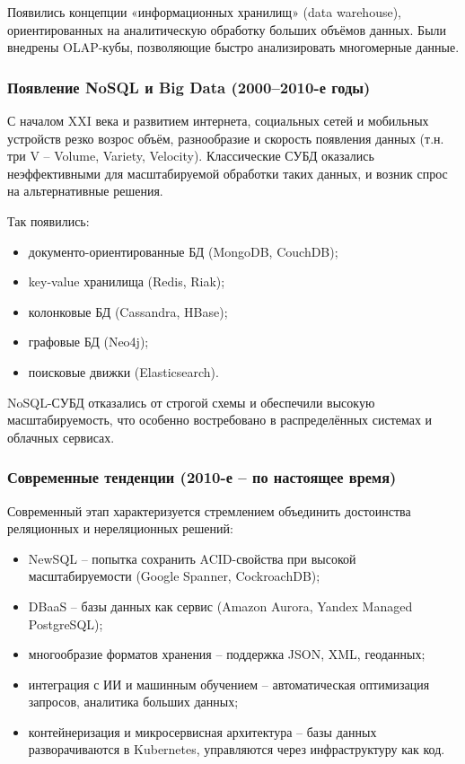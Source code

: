 Появились концепции «информационных хранилищ» (data warehouse), ориентированных на аналитическую обработку больших объёмов данных. Были внедрены OLAP-кубы, позволяющие быстро анализировать многомерные данные.

\subsubsection{Появление NoSQL и Big Data (2000--2010-е годы)}

С началом XXI века и развитием интернета, социальных сетей и мобильных устройств резко возрос объём, разнообразие и скорость появления данных (т.н. три V -- Volume, Variety, Velocity). Классические СУБД оказались неэффективными для масштабируемой обработки таких данных, и возник спрос на альтернативные решения.

Так появились:
\begin{itemize}
	\item документо-ориентированные БД (MongoDB, CouchDB);
	\item key-value хранилища (Redis, Riak);
	\item колонковые БД (Cassandra, HBase);
	\item графовые БД (Neo4j);
	\item поисковые движки (Elasticsearch).
\end{itemize}

NoSQL-СУБД отказались от строгой схемы и обеспечили высокую масштабируемость, что особенно востребовано в распределённых системах и облачных сервисах.

\subsubsection{Современные тенденции (2010-е -- по настоящее время)}

Современный этап характеризуется стремлением объединить достоинства реляционных и нереляционных решений:
\begin{itemize}
	\item NewSQL -- попытка сохранить ACID-свойства при высокой масштабируемости (Google Spanner, CockroachDB);
	\item DBaaS -- базы данных как сервис (Amazon Aurora, Yandex Managed PostgreSQL);
	\item многообразие форматов хранения -- поддержка JSON, XML, геоданных;
	\item интеграция с ИИ и машинным обучением -- автоматическая оптимизация запросов, аналитика больших данных;
	\item контейнеризация и микросервисная архитектура -- базы данных разворачиваются в Kubernetes, управляются через инфраструктуру как код.
\end{itemize}

